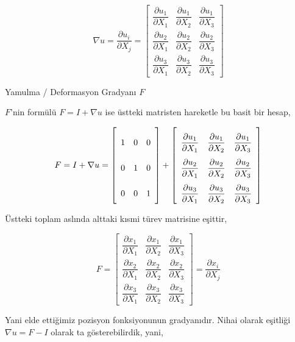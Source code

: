 \documentclass[12pt,fleqn]{article}\usepackage{../../common}
\begin{document}
$$
\renewcommand*{\arraystretch}{2.5}
\nabla u = \frac{\partial u_i}{\partial X_j} =
\left[\begin{array}{ccc}
\dfrac{\partial u_1}{\partial X_1} & \dfrac{\partial u_1}{\partial X_2} & \dfrac{\partial u_1}{\partial X_3} \\
\dfrac{\partial u_2}{\partial X_1} & \dfrac{\partial u_2}{\partial X_2} & \dfrac{\partial u_2}{\partial X_3} \\
\dfrac{\partial u_3}{\partial X_1} & \dfrac{\partial u_3}{\partial X_2} & \dfrac{\partial u_3}{\partial X_3} 
\end{array}\right]
$$

Yamulma / Deformasyon Gradyanı $F$

$F$'nin formülü $F = I + \nabla u$ ise üstteki matristen hareketle bu basit
bir hesap,

$$
F = I + \nabla u = 
\left[\begin{array}{ccc}
1 & 0 & 0 \\ 0 & 1 & 0 \\ 0 & 0 & 1
\end{array}\right] + 
\renewcommand*{\arraystretch}{2.5}
\left[\begin{array}{ccc}
\dfrac{\partial u_1}{\partial X_1} & \dfrac{\partial u_1}{\partial X_2} & \dfrac{\partial u_1}{\partial X_3} \\
\dfrac{\partial u_2}{\partial X_1} & \dfrac{\partial u_2}{\partial X_2} & \dfrac{\partial u_2}{\partial X_3} \\
\dfrac{\partial u_3}{\partial X_1} & \dfrac{\partial u_3}{\partial X_2} & \dfrac{\partial u_3}{\partial X_3} 
\end{array}\right]
$$

Üstteki toplam aslında alttaki kısmi türev matrisine eşittir,

$$
\renewcommand*{\arraystretch}{2.5}
F = \left[\begin{array}{ccc}
\dfrac{\partial x_1}{\partial X_1} & \dfrac{\partial x_1}{\partial X_2} & \dfrac{\partial x_1}{\partial X_3} \\
\dfrac{\partial x_2}{\partial X_1} & \dfrac{\partial x_2}{\partial X_2} & \dfrac{\partial x_2}{\partial X_3} \\
\dfrac{\partial x_3}{\partial X_1} & \dfrac{\partial x_3}{\partial X_2} & \dfrac{\partial x_3}{\partial X_3} 
\end{array}\right] =
\frac{\partial x_i}{\partial X_j}
$$

Yani elde ettiğimiz pozisyon fonksiyonunun gradyanıdır. Nihai olarak eşitliği
$\nabla u = F - I$ olarak ta gösterebilirdik, yani,
\end{document}
